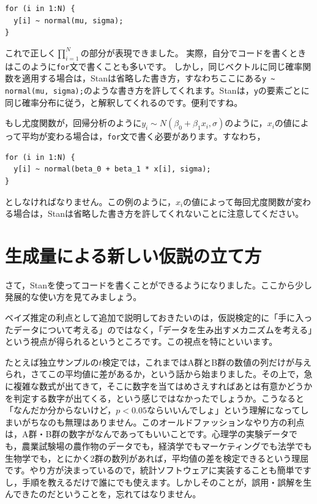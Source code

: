 \documentclass{ltjbook}
\begin{document}
\begin{verbatim}
for (i in 1:N) {
  y[i] ~ normal(mu, sigma);
}
\end{verbatim}
これで正しく$\prod_{i=1}^{N}$の部分が表現できました。
実際，自分でコードを書くときはこのように\verb|for|文で書くことも多いです。
しかし，同じベクトルに同じ確率関数を適用する場合は，Stanは省略した書き方，すなわちここにある\verb|y ~ normal(mu, sigma);|のような書き方を許してくれます。Stanは，\verb|y|の要素ごとに同じ確率分布に従う，と解釈してくれるのです。便利ですね。

もし尤度関数が，回帰分析のように$y_i \sim N(\beta_0 + \beta_1 x_i, \sigma)$のように，$x_i$の値によって平均が変わる場合は，\verb|for|文で書く必要があります。すなわち，

\begin{verbatim}
for (i in 1:N) {
  y[i] ~ normal(beta_0 + beta_1 * x[i], sigma);
}
\end{verbatim}

としなければなりません。この例のように，$x_i$の値によって毎回尤度関数が変わる場合は，Stanは省略した書き方を許してくれないことに注意してください。

\section{生成量による新しい仮説の立て方}

さて，Stanを使ってコードを書くことができるようになりました。ここから少し発展的な使い方を見てみましょう。

ベイズ推定の利点として追加で説明しておきたいのは，仮説検定的に「手に入ったデータについて考える」のではなく，「データを生み出すメカニズムを考える」という視点が得られるというところです。この視点を特にといいます。

たとえば独立サンプルの$t$検定では，これまではA群とB群の数値の列だけが与えられ，さてこの平均値に差があるか，という話から始まりました。その上で，急に複雑な数式が出てきて，そこに数字を当てはめさえすればあとは有意かどうかを判定する数字が出てくる，という感じではなかったでしょうか。こうなると「なんだか分からないけど，$p<0.05$ならいいんでしょ」という理解になってしまいがちなのも無理はありません。このオールドファッションなやり方の利点は，A群・B群の数字がなんであってもいいことです。心理学の実験データでも，農業試験場の農作物のデータでも，経済学でもマーケティングでも法学でも生物学でも，とにかく2群の数列があれば，平均値の差を検定できるという理屈です。やり方が決まっているので，統計ソフトウェアに実装することも簡単ですし，手順を教えるだけで誰にでも使えます。しかしそのことが，誤用・誤解を生んできたのだということを，忘れてはなりません。
\end{document}

